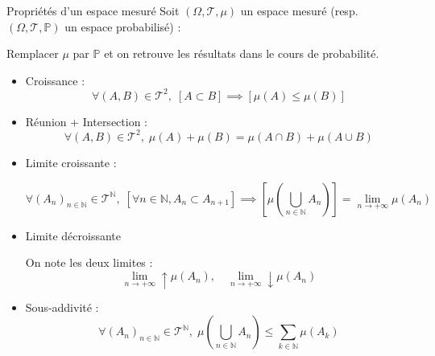 \begin{Prop}{Propriétés d'un espace mesuré}{}
Soit $(\Omega, \mathcal{T},\mu)$ un espace mesuré (resp. $(\Omega, \mathcal{T}, \mathbb{P})$ un espace probabilisé) : 

\begin{note}{}{}
Remplacer $\mu$ par $\mathbb{P}$ et on retrouve les résultats dans le cours de probabilité.
\end{note}


\begin{itemize}

    \item Croissance : 
      \begin{equation}
        \forall (A, B) \in \mathcal{T} ^{2}, \; [A \subset B] \implies [\mu(A) \le \mu(B)]
      \end{equation}

    \item Réunion + Intersection : 
      \begin{equation}
        \forall (A, B) \in \mathcal{T} ^{2}, \; \mu(A) + \mu(B) = \mu(A \cap B) + \mu (A \cup B)
      \end{equation} 

    \item Limite croissante : 

      \begin{equation}
        \forall (A_n) _{n \in \mathbb{N}} \in \mathcal{T} ^{\mathbb{N}}, \; [\forall n \in \mathbb{N}, A_n \subset A _{n+1}] \implies \left[ \mu \left( \bigcup _{n\in \mathbb{N}} A_n \right)\right] = \lim _{n \to + \infty} \mu (A_n)
      \end{equation}

    \item Limite décroissante 

      \begin{tcolorbox}
        On note les deux limites : 
        \begin{equation}
          \lim _{n \to + \infty} \uparrow \mu (A_n), \quad 
          \lim _{n \to + \infty} \downarrow \mu (A_n)
          \label{eq: 2.11}
        \end{equation}
      \end{tcolorbox}
    \item Sous-addivité : 
      \begin{equation}
        \forall (A_n) _{n \in \mathbb{N}} \in \mathcal{T} ^{\mathbb{N}}, \; \mu \left( \bigcup _{n \in \mathbb{N}} A_n\right) \le \sum_{k \in \mathbb{N}}^{} \mu(A_k)
      \end{equation}

\end{itemize}
\end{Prop}

